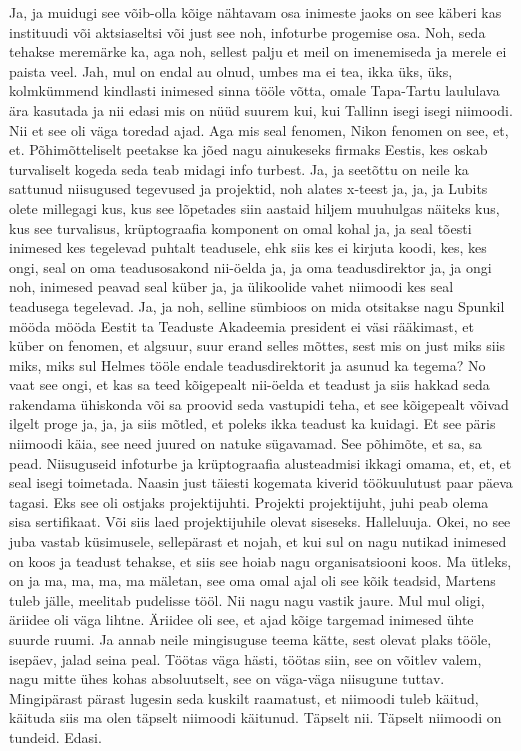 Ja, ja muidugi see võib-olla kõige nähtavam osa inimeste jaoks on see käberi kas instituudi või aktsiaseltsi või just see noh, infoturbe progemise osa. Noh, seda tehakse meremärke ka, aga noh, sellest palju et meil on imenemiseda ja merele ei paista veel.
Jah, mul on endal au olnud, umbes ma ei tea, ikka üks, üks, kolmkümmend kindlasti inimesed sinna tööle võtta, omale Tapa-Tartu laululava ära kasutada ja nii edasi mis on nüüd suurem kui, kui Tallinn isegi isegi niimoodi. Nii et see oli väga toredad ajad. Aga mis seal fenomen, Nikon fenomen on see, et, et.
Põhimõtteliselt peetakse ka jõed nagu ainukeseks firmaks Eestis, kes oskab turvaliselt kogeda seda teab midagi info turbest. Ja, ja seetõttu on neile ka sattunud niisugused tegevused ja projektid, noh alates x-teest ja, ja, ja Lubits olete millegagi kus, kus see lõpetades siin aastaid hiljem muuhulgas näiteks kus, kus see turvalisus, krüptograafia komponent on omal kohal ja, ja seal tõesti inimesed kes tegelevad puhtalt teadusele, ehk siis kes ei kirjuta koodi, kes, kes ongi, seal on oma teadusosakond nii-öelda ja, ja oma teadusdirektor ja, ja ongi noh, inimesed peavad seal küber ja, ja ülikoolide vahet niimoodi kes seal teadusega tegelevad. Ja, ja noh, selline sümbioos on mida otsitakse nagu Spunkil mööda mööda Eestit ta Teaduste Akadeemia president ei väsi rääkimast, et küber on fenomen, et algsuur, suur erand selles mõttes, sest mis on just miks siis miks, miks sul Helmes tööle endale teadusdirektorit ja asunud ka tegema? No vaat see ongi, et kas sa teed kõigepealt nii-öelda et teadust ja siis hakkad seda rakendama ühiskonda või sa proovid seda vastupidi teha, et see kõigepealt võivad ilgelt proge ja, ja, ja siis mõtled, et poleks ikka teadust ka kuidagi. Et see päris niimoodi käia, see need juured on natuke sügavamad. See põhimõte, et sa, sa pead.
Niisuguseid infoturbe ja krüptograafia alusteadmisi ikkagi omama, et, et, et seal isegi toimetada. Naasin just täiesti kogemata kiverid töökuulutust paar päeva tagasi. Eks see oli ostjaks projektijuhti. Projekti projektijuht, juhi peab olema sisa sertifikaat. Või siis laed projektijuhile olevat siseseks. Halleluuja.
Okei, no see juba vastab küsimusele, sellepärast et nojah, et kui sul on nagu nutikad inimesed on koos ja teadust tehakse, et siis see hoiab nagu organisatsiooni koos. Ma ütleks, on ja ma, ma, ma, ma mäletan, see oma omal ajal oli see kõik teadsid, Martens tuleb jälle, meelitab pudelisse tööl. Nii nagu nagu vastik jaure.
Mul mul oligi, äriidee oli väga lihtne. Äriidee oli see, et ajad kõige targemad inimesed ühte suurde ruumi. Ja annab neile mingisuguse teema kätte, sest olevat plaks tööle, isepäev, jalad seina peal. Töötas väga hästi, töötas siin, see on võitlev valem, nagu mitte ühes kohas absoluutselt, see on väga-väga niisugune tuttav.
Mingipärast pärast lugesin seda kuskilt raamatust, et niimoodi tuleb käitud, käituda siis ma olen täpselt niimoodi käitunud.
Täpselt nii. Täpselt niimoodi on tundeid. Edasi.



